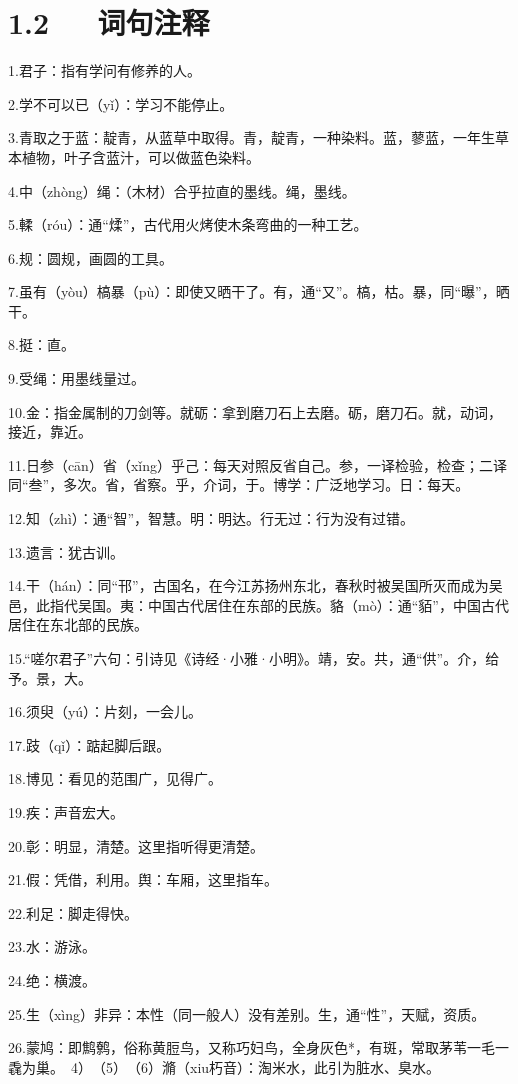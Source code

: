 \documentclass[letterpaper,12pt,english]{sphinxmanual}
\begin{document}
\section{1.2   词句注释}
\label{\detokenize{p01_u6563_u6587/_u8340_u5b50-_u529d_u5b66:id4}}
1.君子：指有学问有修养的人。

2.学不可以已（yǐ）：学习不能停止。

3.青取之于蓝：靛青，从蓝草中取得。青，靛青，一种染料。蓝，蓼蓝，一年生草本植物，叶子含蓝汁，可以做蓝色染料。

4.中（zhòng）绳：（木材）合乎拉直的墨线。绳，墨线。

5.輮（róu）：通“煣”，古代用火烤使木条弯曲的一种工艺。

6.规：圆规，画圆的工具。

7.虽有（yòu）槁暴（pù）：即使又晒干了。有，通“又”。槁，枯。暴，同“曝”，晒干。

8.挺：直。

9.受绳：用墨线量过。

10.金：指金属制的刀剑等。就砺：拿到磨刀石上去磨。砺，磨刀石。就，动词，接近，靠近。

11.日参（cān）省（xǐng）乎己：每天对照反省自己。参，一译检验，检查；二译同“叁”，多次。省，省察。乎，介词，于。博学：广泛地学习。日：每天。

12.知（zhì）：通“智”，智慧。明：明达。行无过：行为没有过错。

13.遗言：犹古训。

14.干（hán）：同“邗”，古国名，在今江苏扬州东北，春秋时被吴国所灭而成为吴邑，此指代吴国。夷：中国古代居住在东部的民族。貉（mò）：通“貊”，中国古代居住在东北部的民族。

15.“嗟尔君子”六句：引诗见《诗经·小雅·小明》。靖，安。共，通“供”。介，给予。景，大。

16.须臾（yú）：片刻，一会儿。

17.跂（qǐ）：踮起脚后跟。

18.博见：看见的范围广，见得广。

19.疾：声音宏大。

20.彰：明显，清楚。这里指听得更清楚。

21.假：凭借，利用。舆：车厢，这里指车。

22.利足：脚走得快。

23.水：游泳。

24.绝：横渡。

25.生（xìng）非异：本性（同一般人）没有差别。生，通“性”，天赋，资质。

26.蒙鸠：即鹪鹩，俗称黄脰鸟，又称巧妇鸟，全身灰色*，有斑，常取茅苇一毛一毳为巢。　4）　（5）　（6）滫（xiu朽音）：淘米水，此引为脏水、臭水。
\end{document}
